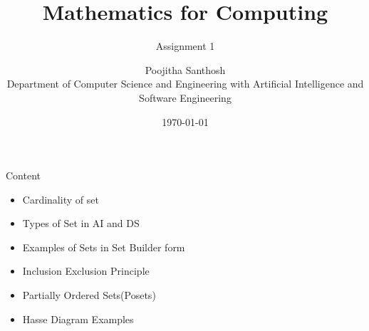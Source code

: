 \documentclass{beamer}
\title{\textbf{Mathematics for Computing}}
\subtitle{Assignment 1}
\author{%
Poojitha Santhosh \\[0.3cm]
Department of Computer Science and Engineering with Artificial Intelligence and Software Engineering \\[0.2cm]
 }
\institute{
CUSAT
}
\date{\today}
\begin{document}
\begin{frame}
    \titlepage
\end{frame}



\begin{frame}{Content}
\begin{itemize}
    \item Cardinality of set
    \item Types of Set in AI and DS
    \item Examples of Sets in Set Builder form
    \item Inclusion Exclusion Principle
    \item Partially Ordered Sets(Posets)
    \item Hasse Diagram Examples
\end{itemize}
\end{frame}
\end{document}
